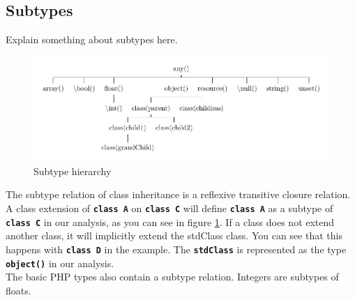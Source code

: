 \documentclass[../main.tex]{subfiles}
\begin{document}
    \subsection{Subtypes}
    
    Explain something about subtypes here.

    \blindtext %
    
    \begin{figure}[H]
        \includegraphics{Diagrams/Subtypes.pdf}
        \caption{Subtype hierarchy}
        \label{fig:subtypes}
    \end{figure}

    The subtype relation of class inheritance is a \gls{reflexive transitive closure} relation.
    A class extension of \textbf{\texttt{class A}} on \textbf{\texttt{class C}} will define \textbf{\texttt{class A}} as a subtype of \textbf{\texttt{class C}} in our analysis, as you can see in figure \ref{fig:subtypes}.
    If a class does not extend another class, it will implicitly extend the \gls{stdClass} class.
    You can see that this happens with \textbf{\texttt{class D}} in the example.
    The \textbf{\texttt{stdClass}} is represented as the type \textbf{\texttt{object()}} in our analysis.
    \\
    The basic PHP types also contain a subtype relation.
    Integers are subtypes of floats.
 
\end{document}
